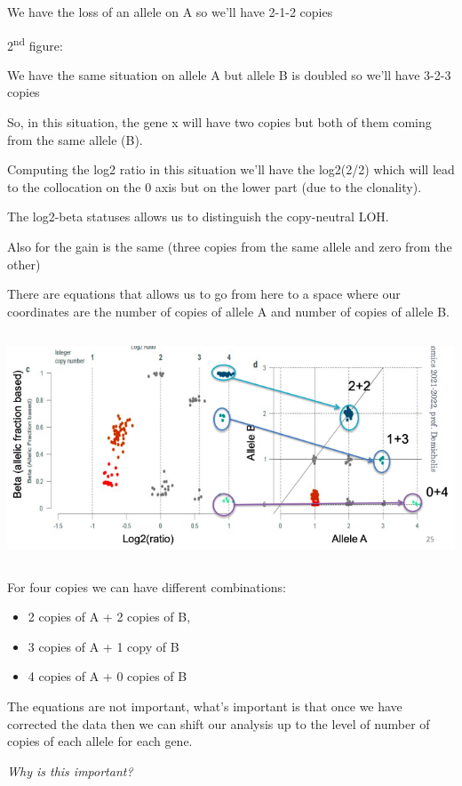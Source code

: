 We have the loss of an allele on A so we'll have 2-1-2 copies

2\textsuperscript{nd} figure:

We have the same situation on allele A but allele B is doubled so we'll have
3-2-3 copies

So, in this situation, the gene x will have two copies but both of them coming
from the same allele (B).

Computing the log2 ratio in this situation we'll have the log2(2/2) which will
lead to the collocation on the 0 axis but on the lower part (due to the
clonality).

The log2-beta statuses allows us to distinguish the copy-neutral LOH.

Also for the gain is the same (three copies from the same allele and zero from
the other)

There are equations that allows us to go from here to a space where our
coordinates are the number of copies of allele A and number of copies of allele
B.\includegraphics[width=6.68889in,height=2.97633in]{image12.png}For four copies
we can have different combinations:

\begin{itemize}
\item
  2 copies of A + 2 copies of B,
\item
  3 copies of A + 1 copy of B
\item
  4 copies of A + 0 copies of B
\end{itemize}

The equations are not important, what's important is that once we have corrected
the data then we can shift our analysis up to the level of number of copies of
each allele for each gene.

\emph{Why is this important?}

